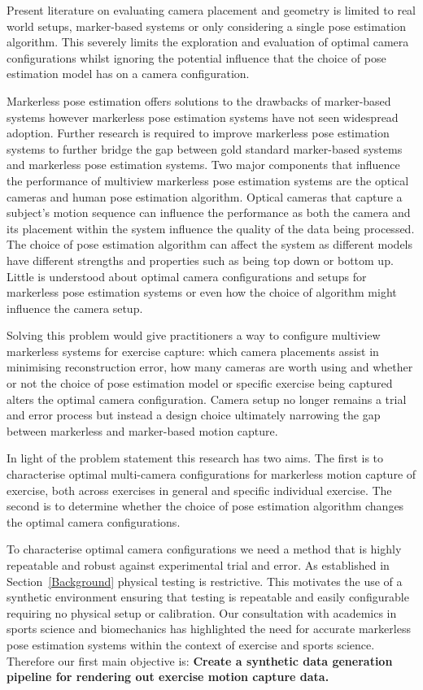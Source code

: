 Present literature on evaluating camera placement and geometry is limited to real world setups, marker-based systems or only considering a single pose estimation algorithm. This severely limits the exploration and evaluation of optimal camera configurations whilst ignoring the potential influence that the choice of pose estimation model has on a camera configuration.

Markerless pose estimation offers solutions to the drawbacks of marker-based systems however markerless pose estimation systems have not seen widespread adoption. Further research is required to improve markerless pose estimation systems to further bridge the gap between gold standard marker-based systems and markerless pose estimation systems. Two major components that influence the performance of multiview markerless pose estimation systems are the optical cameras and human pose estimation algorithm. 
Optical cameras that capture a subject's motion sequence can influence the performance as both the camera and its placement within the system influence the quality of the data being processed. The choice of pose estimation algorithm can affect the system as different models have different strengths and properties such as being top down or bottom up.  Little is understood about optimal camera configurations and setups for markerless pose estimation systems or even how the choice of algorithm might influence the camera setup.

Solving this problem would give practitioners a way to configure multiview markerless systems for exercise capture: which camera placements assist in minimising reconstruction error, how many cameras are worth using and whether or not the choice of pose estimation model or specific exercise being captured alters the optimal camera configuration. Camera setup no longer remains a trial and error process but instead a design choice ultimately narrowing the gap between markerless and marker-based motion capture.


In light of the problem statement this research has two aims. The first is to characterise optimal multi-camera configurations for markerless motion capture of exercise, both across exercises in general and specific individual exercise. The second is to determine whether the choice of pose estimation algorithm changes the optimal camera configurations.

To characterise optimal camera configurations we need a method that is highly repeatable and robust against experimental trial and error. As established in Section~\ref{Background} physical testing is restrictive. This motivates the use of a synthetic environment ensuring that testing is repeatable and easily configurable requiring no physical setup or calibration. Our consultation with academics in sports science and biomechanics has highlighted the need for accurate markerless pose estimation systems within the context of exercise and sports science. Therefore our first main objective is: \textbf{Create a synthetic data generation pipeline for rendering out exercise motion capture data.}

